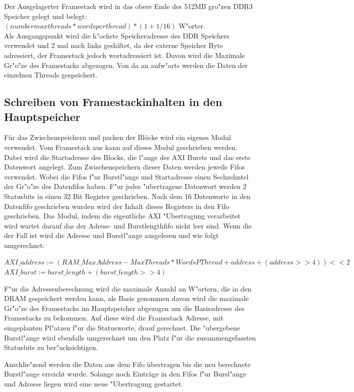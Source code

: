 Der Ausgelagerter Framestack wird in das obere Ende des 512MB gro"zen DDR3 Speicher gelegt und belegt:\\ $(number max threads * words per thread)*(1+1/16) $ W"orter.\\
Als Ausgangspunkt wird die h"ochste Speicheradresse des DDR Speichers verwendet und 2 mal nach links geshiftet, da der externe Speicher Byte adressiert, der Framestack jedoch wortadressiert ist. Davon wird die Maximale Gr"o"ze des Framestacks abgezogen. Von da an aufw"arts werden die Daten der einzelnen Threads gespeichert.

\subsection{Schreiben von Framestackinhalten in den Hauptspeicher}
F\"ur das Zwischenspeichern und packen der Bl\"ocke wird ein eigenes Modul verwendet.
Vom Framestack aus kann auf dieses Modul geschrieben werden. Dabei wird die Startadresse des Blocks, die l"ange des AXI Bursts und das erste Datenwort angelegt. Zum Zwischenspeichern dieser Daten werden jeweils Fifos verwendet. Wobei die Fifos f"ur Burstl"ange und Startadresse einen Sechzehntel der Gr"o{"z}e des Datenfifos haben. F"ur jedes "ubertragene Datenwort werden 2 Statusbits in einen 32 Bit Register geschrieben. Nach dem 16 Datenworte in den Datenfifo geschrieben wurden wird der Inhalt dieses Registers in den Fifo geschrieben. 
Das Modul, indem die eigentliche AXI "Ubertragung verarbeitet wird wartet darauf das der Adress- und Burstlengthfifo nicht leer sind. Wenn die der Fall ist wird die Adresse und Burstl"ange ausgelesen und wie folgt umgerechnet:

$AXI\_address := (RAM\_MaxAddress - MaxThreads*WordsPThread + address +(address >> 4))<<2$\\
$AXI\_burst := burst\_length + (burst\_length >> 4)$

F"ur die Adressenberechnung wird die maximale Anzahl an W"ortern, die in den DRAM gespeichert werden kann, als Basis genommen davon wird die maximale Gr"o"ze des Framestacks im Hauptspeicher abgezogen um die Basisadresse des Framestacks zu bekommen. Auf diese wird die Framestack Adresse, mit eingeplanten Pl"atzen f"ur die Statusworte, drauf gerechnet. 
Die "ubergebene Burstl"ange wird ebenfalls umgerechnet um den Platz f"ur die zusammengefassten Statusbits zu ber"ucksichtigen.

Anschlie"zend werden die Daten aus dem Fifo \"ubertragen bis die neu berechnete Burstl"ange erreicht wurde. Solange noch Eintr\"age in den Fifos f"ur Bursl"ange und Adresse liegen wird eine neue "Ubertragung gestartet. 

